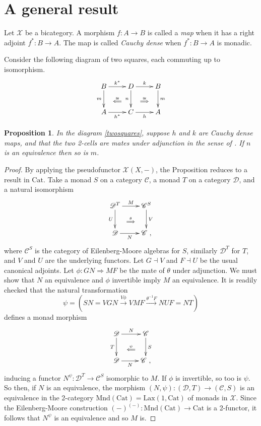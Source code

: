 \documentclass[a4paper,12pt,reqno]{amsart}
\newtheorem{proposition}[theorem]{Proposition}
\theoremstyle{definition}
\theoremstyle{fact}
\theoremstyle{genquest}
\theoremstyle{step}
\newcommand{\dd}{\colon}
\newcommand{\lra}{\longrightarrow}
\newcommand{\ra}{\rightarrow}
\newcommand{\Lra}{\Longrightarrow}
\newcommand{\Lla}{\Longleftarrow}
\def\CC{{\mathscr C}}
\def\CD{{\mathscr D}}
\def\CX{{\mathscr X}}
\begin{document}
\section{A general result}\label{gr}

Let $\CX$ be a bicategory. 
A morphism $f \dd A\ra B$ is called a {\em map} when it has a right adjoint $f^*\dd B\ra A$.
The map is called {\em Cauchy dense} when $f^*\dd B\ra A$ is monadic. 

Consider the following diagram of two squares, each commuting up to isomorphism.
\begin{eqnarray}\label{twosquares}
\begin{aligned}
\xymatrix{\ar @{} [dr] | {\stackrel{\cong} \Lla}
B \ar[d]_-{m} \ar[r]^-{k^*} & \ar @{} [dr] | {\stackrel{\cong} \Lra} D \ar[d]_-{n} \ar[r]^-{k} & B \ar[d]^-{m}\\
A \ar[r]_-{h^*}           & C  \ar[r]_-{h} & A
}
\end{aligned}
\end{eqnarray}

\begin{proposition}\label{nequivthenmequiv}
In the diagram \eqref{twosquares}, suppose $h$ and $k$ are Cauchy dense maps,
and that the two 2-cells are mates under adjunction in the sense of \cite{KelSt1974}.
If $n$ is an equivalence then so is $m$.  
\end{proposition}
\begin{proof}
By applying the pseudofunctor $\CX(X,-)$, the Proposition reduces to a result in $\mathrm{Cat}$.
Take a monad $S$ on a category $\CC$, a monad $T$ on a category $\CD$,
and a natural isomorphism
$$
\xymatrix{\ar @{} [dr] | {\stackrel{\theta} \Lra}
\CD^T \ar[d]_-{U} \ar[r]^-{M} & \CC^S \ar[d]^-{V} \\
\CD \ar[r]_-{N}           & \CC \ ,
}$$
where $\CC^S$ is the category of Eilenberg-Moore algebras for $S$, similarly $\CD^T$
for $T$,
and $V$ and $U$ are the underlying functors. 
Let $G\dashv V$ and $F\dashv U$ be the usual canonical adjoints.
Let $\phi \dd GN \Rightarrow MF$ be the mate of $\theta$ under adjunction.
We must show that $N$ an equivalence and $\phi$ invertible imply $M$ an equivalence.
It is readily checked that the natural transformation
$$\psi = (SN = VGN \stackrel{V\phi}\lra VMF\stackrel{\theta^{-1}F}\lra NUF = NT)$$
defines a monad morphism 
$$
\xymatrix{\ar @{} [dr] | {\stackrel{\psi} \Lla}
\CD \ar[d]_-{T} \ar[r]^-{N} & \CC \ar[d]^-{S} \\
\CD \ar[r]_-{N}           & \CC \ ,
}$$
inducing a functor $N^{\psi} \dd \CD^T \ra \CC^S$ isomorphic to $M$.
If $\phi$ is invertible, so too is $\psi$. So then, if $N$ is an equivalence, the morphism 
$(N,\psi) \dd (\CD,T) \ra (\CC,S)$ is an equivalence in the 2-category 
$\mathrm{Mnd}(\mathrm{Cat}) = \mathrm{Lax}(1,\mathrm{Cat})$ of monads in $\CX$.
Since the Eilenberg-Moore construction 
$(-)^{(-)}\dd \mathrm{Mnd}(\mathrm{Cat}) \ra \mathrm{Cat}$ is a 2-functor, 
it follows that $N^{\psi}$ is an equivalence and so $M$ is. 
\end{proof}
\end{document}
